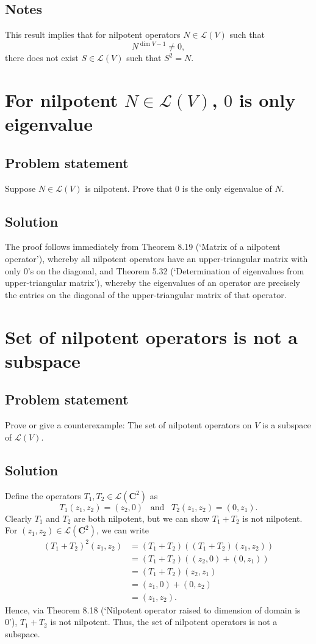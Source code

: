 \documentclass{article}
\begin{document}
\subsection*{Notes}
This result implies that for nilpotent operators $N\in\mathcal{L}(V)$ such that 
\[N^{\operatorname{dim}V-1}\neq0,\]
there does not exist $S\in\mathcal{L}(V)$ such that $S^2=N$.

\clearpage

\section{For nilpotent $N\in\mathcal{L}(V)$, $0$ is only eigenvalue}
\subsection*{Problem statement}
Suppose $N\in\mathcal{L}(V)$ is nilpotent. 
Prove that $0$ is the only eigenvalue of $N$.

\subsection*{Solution}
The proof follows immediately from Theorem 8.19 (`Matrix of a nilpotent operator'), whereby all nilpotent operators have an upper-triangular matrix with only $0$'s on the diagonal, and Theorem 5.32 (`Determination of eigenvalues from upper-triangular matrix'), whereby the eigenvalues of an operator are precisely the entries on the diagonal of the upper-triangular matrix of that operator.


\clearpage

\section{Set of nilpotent operators is not a subspace}
\subsection*{Problem statement}
Prove or give a counterexample: 
The set of nilpotent operators on $V$ is a subspace of $\mathcal{L}(V)$.

\subsection*{Solution}
Define the operators $T_1,T_2\in\mathcal{L}(\mathbf{C}^2)$ as 
\[T_1(z_1,z_2)=(z_2,0)\;\;\;\text{and}\;\;\;T_2(z_1,z_2)=(0,z_1).\]
Clearly $T_1$ and $T_2$ are both nilpotent, but we can show $T_1+T_2$ is not nilpotent. For $(z_1,z_2)\in\mathcal{L}(\mathbf{C}^2)$, we can write
\begin{align*}
    (T_1+T_2)^2(z_1,z_2)&=(T_1+T_2)((T_1+T_2)(z_1,z_2))\\
    &=(T_1+T_2)((z_2,0)+(0,z_1))\\
    &=(T_1+T_2)(z_2,z_1)\\
    &=(z_1,0)+(0,z_2)\\
    &=(z_1,z_2).
\end{align*}
Hence, via Theorem 8.18 (`Nilpotent operator raised to dimension of domain is 0'), $T_1+T_2$ is not nilpotent. 
Thus, the set of nilpotent operators is not a subspace.
\end{document}
